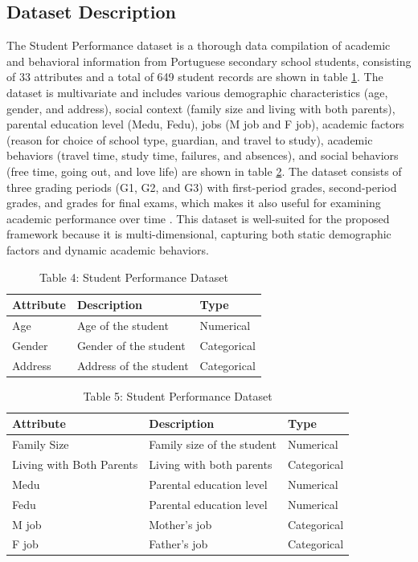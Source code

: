 \documentclass[twocolumn]{svjour3}
\begin{document}
\subsection{Dataset Description}
The Student Performance dataset is a thorough data compilation of academic and behavioral information from Portuguese secondary school students, consisting of 33 attributes and a total of 649 student records are shown in table \ref{tab:table4}. The dataset is multivariate and includes various demographic characteristics (age, gender, and address), social context (family size and living with both parents), parental education level (Medu, Fedu), jobs (M job and F job), academic factors (reason for choice of school type, guardian, and travel to study), academic behaviors (travel time, study time, failures, and absences), and social behaviors (free time, going out, and love life) are shown in table \ref{tab:table5}. The dataset consists of three grading periods (G1, G2, and G3) with first-period grades, second-period grades, and grades for final exams, which makes it also useful for examining academic performance over time \cite{ref26}. This dataset is well-suited for the proposed framework because it is multi-dimensional, capturing both static demographic factors and dynamic academic behaviors.
\begin{table}[h]
\centering
\caption{Table 4: Student Performance Dataset}
\label{tab:table4}
\begin{tabular}{lll}
\hline
Attribute & Description & Type \\
\hline
Age & Age of the student & Numerical \\
Gender & Gender of the student & Categorical \\
Address & Address of the student & Categorical \\
\hline
\end{tabular}
\end{table}
\begin{table}[h]
\centering
\caption{Table 5: Student Performance Dataset}
\label{tab:table5}
\begin{tabular}{lll}
\hline
Attribute & Description & Type \\
\hline
Family Size & Family size of the student & Numerical \\
Living with Both Parents & Living with both parents & Categorical \\
Medu & Parental education level & Numerical \\
Fedu & Parental education level & Numerical \\
M job & Mother's job & Categorical \\
F job & Father's job & Categorical \\
\hline
\end{tabular}
\end{table}
\end{document}
